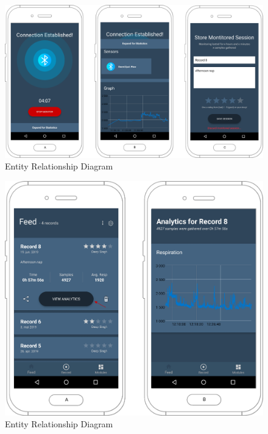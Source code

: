 \begin{figure}
    \centering
    \includegraphics[scale=0.26]{images/Recording_img.pdf}
    \caption{Entity Relationship Diagram}
    \label{fig:impl_modules}
\end{figure}

\begin{figure}
    \centering
    \includegraphics[scale=0.26]{images/Analytics_img.pdf}
    \caption{Entity Relationship Diagram}
    \label{fig:impl_modules}
\end{figure}


